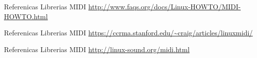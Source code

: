 \documentclass[12pt]{article}
\begin{document}

\begin{thebibliography}{99}

 Referenicas Librerias MIDI \url{http://www.faqs.org/docs/Linux-HOWTO/MIDI-HOWTO.html}

 Referenicas Librerias MIDI \url{https://ccrma.stanford.edu/~craig/articles/linuxmidi/}

 Referenicas Librerias MIDI \url{http://linux-sound.org/midi.html}

\end{thebibliography}
\end{document}
